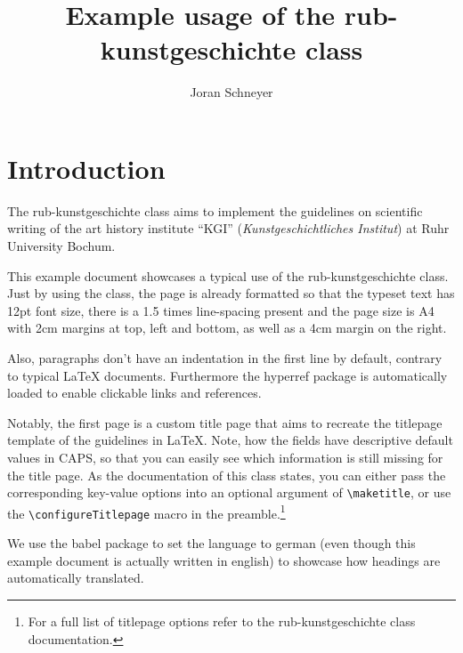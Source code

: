 \documentclass{rub-kunstgeschichte}
\title{Example usage of the \textsf{rub-kunstgeschichte} class}
\author{Joran Schneyer}
\begin{document}
    \maketitle

    \tableofcontents

    \clearpage

    \section{Introduction}
    The \textsf{rub-kunstgeschichte} class aims to implement the guidelines on scientific writing of the art history institute ``KGI'' (\textit{Kunstgeschichtliches Institut}) at Ruhr University Bochum.

    This example document showcases a typical use of the \textsf{rub-kunstgeschichte} class.
    Just by using the class, the page is already formatted so that the typeset text has 12pt font size, there is a 1.5 times line-spacing present and the page size is A4 with 2cm margins at top, left and bottom, as well as a 4cm margin on the right.\autocite[See:][11]{guidelines}

    Also, paragraphs don't have an indentation in the first line by default, contrary to typical \LaTeX{} documents.
    Furthermore the \textsf{hyperref} package is automatically loaded to enable clickable links and references.

    Notably, the first page is a custom title page that aims to recreate the titlepage template of the guidelines in \LaTeX.
    Note, how the fields have descriptive default values in CAPS, so that you can easily see which information is still missing for the title page.
    As the documentation of this class states, you can either pass the corresponding key-value options into an optional argument of \verb|\maketitle|, or use the \verb|\configureTitlepage| macro in the preamble.\footnote{For a full list of titlepage options refer to the \textsf{rub-kunstgeschichte} class documentation.}

    We use the \textsf{babel} package to set the language to german (even though this example document is actually written in english) to showcase how headings are automatically translated.
\end{document}

